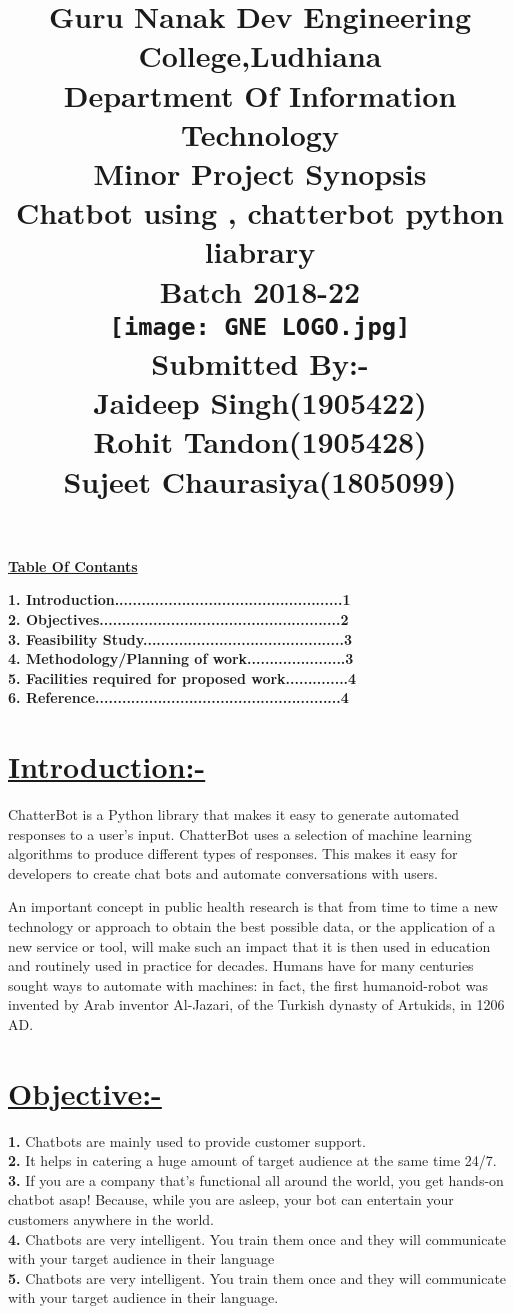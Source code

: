 \documentclass[a4,18pt]{article}
\title{ Guru Nanak Dev Engineering College,Ludhiana\\ Department Of  Information Technology\\Minor Project Synopsis\\Chatbot using , chatterbot python liabrary\\Batch 2018-22 \\\texttt{[image: GNE LOGO.jpg]}\\Submitted By:-\\Jaideep Singh(1905422)\\Rohit Tandon(1905428)\\Sujeet Chaurasiya(1805099)\\}
\begin{document}
\newpage
\begin{center}
    \Large{\textbf{\underline{Table Of Contants}}}
\end{center}
\renewcommand{\baselinestretch}{1.9}
\Large\textbf{
1. Introduction...................................................1\\
2. Objectives......................................................2\\
3. Feasibility Study.............................................3\\
4. Methodology/Planning of work......................3\\
5. Facilities required for proposed work..............4\\
6. Reference.......................................................4}
\newpage
{}
\section{\underline{Introduction:-}}\large ChatterBot is a Python library that makes it easy to generate automated responses to a user’s input. ChatterBot uses a selection of machine learning algorithms to produce different types of responses. This makes it easy for developers to create chat bots and automate conversations with users.\par An important concept in public health research is that from time to time a new technology or approach to obtain the best possible data, or the application of a new service or tool, will make such an impact that it is then used in education and routinely used in practice for decades. Humans have for many centuries sought ways to automate with machines: in fact, the first humanoid-robot was invented by Arab inventor Al-Jazari, of the Turkish dynasty of Artukids, in 1206 AD.
\newpage
\section{\underline{Objective:-}}\textbf{1. }Chatbots are mainly used to provide customer support.\\
\textbf{2. }It helps in catering a huge amount of target audience at the same time 24/7.\\\textbf{3. }If you are a company that’s functional all around the world, you get hands-on chatbot asap! Because, while you are asleep, your bot can entertain your customers anywhere in the world.
\\\textbf{4. }Chatbots are very intelligent. You train them once and they will communicate with your target audience in their language\\\textbf{5. }Chatbots are very intelligent. You train them once and they will communicate with your target audience in their language.
\newpage
\end{document}
